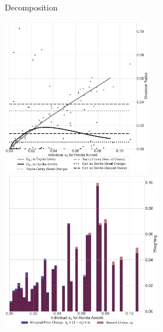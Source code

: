 \documentclass[xcolor=pdftex,dvipsnames,table,mathserif,aspectratio=169]{beamer}
\begin{document}
\begin{frame}[plain]{Decomposition}
\begin{center}
\includegraphics[height=2.7in]{./resources/lines_mte_53_113_19.pdf}
\includegraphics[height=2.7in]{./resources/hist_mte_53_113_19.pdf}
\end{center}
\end{frame}
\end{document}
